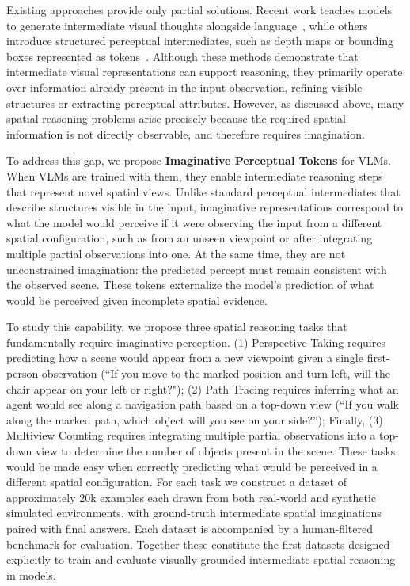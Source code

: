Existing approaches provide only partial solutions. Recent work teaches models to generate intermediate visual thoughts alongside language~\cite{gu2025thinkmorph, li2025mvot, hu2024visualsketchpad}, while others introduce structured perceptual intermediates, such as depth maps or bounding boxes represented as tokens~\cite{bigverdi2024aurora, yang2025mirage, ray2025mulltokens}. Although these methods demonstrate that intermediate visual representations can support reasoning, they primarily operate over information already present in the input observation, refining visible structures or extracting perceptual attributes. However, as discussed above, many spatial reasoning problems arise precisely because the required spatial information is not directly observable, and therefore requires imagination.

To address this gap, we propose \textbf{Imaginative Perceptual Tokens} for VLMs. When VLMs are trained with them, they enable intermediate reasoning steps that represent novel spatial views. Unlike standard perceptual intermediates that describe structures visible in the input, imaginative representations correspond to what the model would perceive if it were observing the input from a different spatial configuration, such as from an unseen viewpoint or after integrating multiple partial observations into one. At the same time, they are not unconstrained imagination: the predicted percept must remain consistent with the observed scene. These tokens externalize the model's prediction of what would be perceived given incomplete spatial evidence. %


To study this capability, we propose three spatial reasoning tasks that fundamentally require imaginative perception. (1) Perspective Taking requires predicting how a scene would appear from a new viewpoint given a single first-person observation (“If you move to the marked position and turn left, will the chair appear on your left or right?"); (2) Path Tracing requires inferring what an agent would see along a navigation path based on a top-down view (“If you walk along the marked path, which object will you see on your side?”); Finally, (3) Multiview Counting requires integrating multiple partial observations into a top-down view to determine the number of objects present in the scene. These tasks would be made easy when correctly predicting what would be perceived in a different spatial configuration. 
For each task we construct a dataset of approximately 20k examples each drawn from both real-world and synthetic simulated environments, with ground-truth intermediate spatial imaginations paired with final answers. Each dataset is accompanied by a human-filtered benchmark for evaluation. Together these constitute the first datasets designed explicitly to train and evaluate visually-grounded intermediate spatial reasoning in models.

